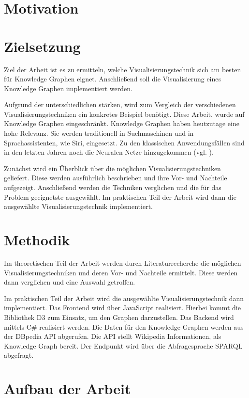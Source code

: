 \section{Motivation}
\section{Zielsetzung}

Ziel der Arbeit ist es zu ermitteln, welche Visualisierungstechnik sich am besten für Knowledge Graphen eignet. Anschließend soll die Visualisierung eines Knowledge Graphen implementiert werden.

Aufgrund der unterschiedlichen stärken, wird zum Vergleich der verschiedenen Visualisierungstechniken ein konkretes Beispiel benötigt. Diese Arbeit, wurde auf Knowledge Graphen eingeschränkt. Knowledge Graphen haben heutzutage eine hohe Relevanz. Sie werden traditionell in Suchmaschinen und in Sprachassistenten, wie Siri, eingesetzt. Zu den klassischen Anwendungsfällen sind in den letzten Jahren noch die Neuralen Netze hinzugekommen (vgl. \cite{wiki:KnowledgeGraph}).

Zunächst wird ein Überblick über die möglichen Visualisierungstechniken geliefert. Diese werden ausführlich beschrieben und ihre Vor- und Nachteile aufgezeigt. Anschließend werden die Techniken verglichen und die für das Problem geeignetste ausgewählt. Im praktischen Teil der Arbeit wird dann die ausgewählte Visualisierungstechnik implementiert. 

\section{Methodik}

Im theoretischen Teil der Arbeit werden durch Literaturrecherche die möglichen Visualisierungstechniken und deren Vor- und Nachteile ermittelt. Diese werden dann verglichen und eine Auswahl getroffen.

Im praktischen Teil der Arbeit wird die ausgewählte Visualisierungstechnik dann implementiert. Das Frontend wird über JavaScript realisiert. Hierbei kommt die Bibliothek D3 zum Einsatz, um den Graphen darzustellen. Das Backend wird mittels C\# realisiert werden. Die Daten für den Knowledge Graphen werden aus der DBpedia API abgerufen. Die API stellt Wikipedia Informationen, als Knowledge Graph bereit. Der Endpunkt wird über die Abfragesprache \ac{SPARQL} abgefragt.

\section{Aufbau der Arbeit}

